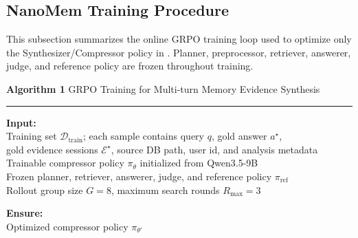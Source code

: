 \subsection{NanoMem Training Procedure}
\label{app:nanomem-training-procedure}

This subsection summarizes the online GRPO training loop used to optimize only
the Synthesizer/Compressor policy in \sys. Planner, preprocessor, retriever,
answerer, judge, and reference policy are frozen throughout training.

\begin{tcolorbox}[
  enhanced jigsaw,
  breakable,
  colback=white,
  colframe=black,
  boxrule=0pt,
  borderline north={0.7pt}{0pt}{black},
  borderline south={0.7pt}{0pt}{black},
  sharp corners,
  left=0pt,
  right=0pt,
  top=2pt,
  bottom=2pt,
  before skip=0.6em,
  after skip=0.8em,
]
\scriptsize
\noindent\textbf{Algorithm 1} GRPO Training for Multi-turn Memory Evidence Synthesis

\vspace{0.15em}
\hrule
\vspace{0.45em}

\noindent\textbf{Input:}\\
\hspace*{1.5em}Training set $\mathcal{D}_{\mathrm{train}}$; each sample contains query $q$, gold answer $a^\star$,\\
\hspace*{1.5em}gold evidence sessions $\mathcal{E}^\star$, source DB path, user id, and analysis metadata\\
\hspace*{1.5em}Trainable compressor policy $\pi_\theta$ initialized from Qwen3.5-9B\\
\hspace*{1.5em}Frozen planner, retriever, answerer, judge, and reference policy $\pi_{\mathrm{ref}}$\\
\hspace*{1.5em}Rollout group size $G=8$, maximum search rounds $R_{\max}=3$

\vspace{0.25em}
\noindent\textbf{Ensure:}\\
\hspace*{1.5em}Optimized compressor policy $\pi_{\theta'}$


\end{tcolorbox}
